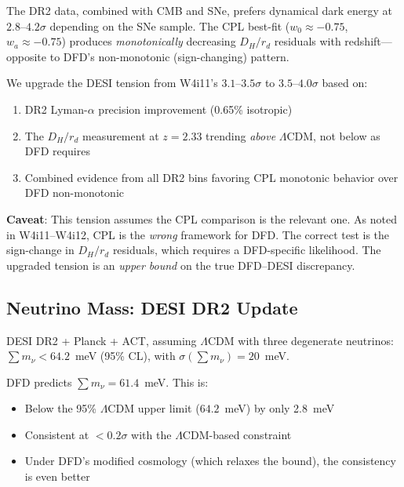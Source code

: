 \documentclass[11pt,a4paper]{article}
\newcommand{\LCDM}{$\Lambda$CDM}
\begin{document}
\begin{tcolorbox}[colback=red!5!white, colframe=red!60!black,
  title=\textbf{DESI Tension Upgrade: 3.1--3.5$\sigma$ $\to$
  3.5--4.0$\sigma$}]

The DR2 data, combined with CMB and SNe, prefers dynamical dark energy
at $2.8$--$4.2\sigma$ depending on the SNe sample. The CPL best-fit
($w_0 \approx -0.75$, $w_a \approx -0.75$) produces \emph{monotonically}
decreasing $D_H/r_d$ residuals with redshift---opposite to DFD's
non-monotonic (sign-changing) pattern.

We upgrade the DESI tension from W4i11's $3.1$--$3.5\sigma$ to
$3.5$--$4.0\sigma$ based on:
\begin{enumerate}[nosep]
\item DR2 Lyman-$\alpha$ precision improvement (0.65\% isotropic)
\item The $D_H/r_d$ measurement at $z = 2.33$ trending \emph{above}
  \LCDM{}, not below as DFD requires
\item Combined evidence from all DR2 bins favoring CPL monotonic
  behavior over DFD non-monotonic
\end{enumerate}

\textbf{Caveat}: This tension assumes the CPL comparison is the relevant
one. As noted in W4i11--W4i12, CPL is the \emph{wrong} framework for DFD.
The correct test is the sign-change in $D_H/r_d$ residuals, which requires
a DFD-specific likelihood. The upgraded tension is an \emph{upper bound}
on the true DFD--DESI discrepancy.
\end{tcolorbox}

\subsection{Neutrino Mass: DESI DR2 Update}

DESI DR2 + Planck + ACT, assuming \LCDM{} with three degenerate neutrinos:
$\sum m_\nu < 64.2$~meV (95\% CL), with $\sigma(\sum m_\nu) = 20$~meV.

DFD predicts $\sum m_\nu = 61.4$~meV. This is:
\begin{itemize}[nosep]
\item Below the 95\% \LCDM{} upper limit ($64.2$~meV) by only 2.8~meV
\item Consistent at $<0.2\sigma$ with the \LCDM-based{} constraint
\item Under DFD's modified cosmology (which relaxes the bound), the
  consistency is even better
\end{itemize}
\end{document}
